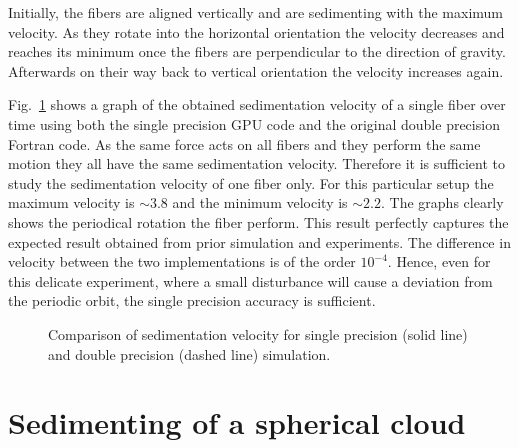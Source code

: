 Initially, the fibers are aligned vertically and are sedimenting with the maximum velocity. As they rotate into the horizontal orientation the velocity decreases and reaches its minimum once the fibers are perpendicular to the direction of gravity. Afterwards on their way back to vertical orientation the velocity increases again.

Fig.~\ref{fig:ring_sedimentation_velocity} shows a graph of the obtained sedimentation velocity of a single fiber over time using both the single precision GPU code and the original double precision Fortran code. As the same force acts on all fibers and they perform the same motion they all have the same sedimentation velocity. Therefore it is sufficient to study the sedimentation velocity of one fiber only. For this particular setup the maximum velocity is ${\sim}3.8$ and the minimum velocity is ${\sim}2.2$. The graphs clearly shows the periodical rotation the fiber perform. This result perfectly captures the expected result obtained from prior simulation and experiments. The difference in velocity between the two implementations is of the order $10^{-4}$. Hence, even for this delicate experiment, where a small disturbance will cause a deviation from the periodic orbit, the single precision accuracy is sufficient.

\begin{figure}[htbp]
  \centering
  \caption[Comparison of sedimentation velocity for single- and double-precision simulation.]{Comparison of sedimentation velocity for single precision (solid line) and double precision (dashed line) simulation.}
  \label{fig:ring_sedimentation_velocity}
\end{figure}

\section{Sedimenting of a spherical cloud}
\label{sec:example_sphere}

